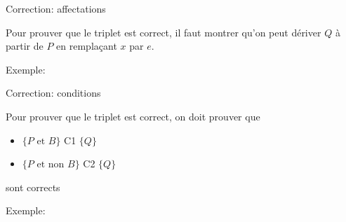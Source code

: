 \begin{frame}{Correction: affectations}

\begin{center}\footnotesize
{}
\end{center}

\bigskip

Pour prouver que le triplet est correct, il faut montrer qu'on peut
dériver $Q$ à partir de $P$ en remplaçant $x$ par $e$.

\bigskip

Exemple:
\begin{center}\footnotesize
{}
\end{center}

\end{frame}

\begin{frame}{Correction: conditions}

\begin{center}\footnotesize
{}
\end{center}

Pour prouver que le triplet est correct, on doit prouver que
\begin{itemize}
\item $\{P\mbox{ et }B\}$ C1 $\{Q\}$
\item $\{P\mbox{ et non }B\}$ C2 $\{Q\}$
\end{itemize}
sont corrects

\bigskip

Exemple:
\begin{center}\footnotesize
{}
\end{center}

\end{frame}


